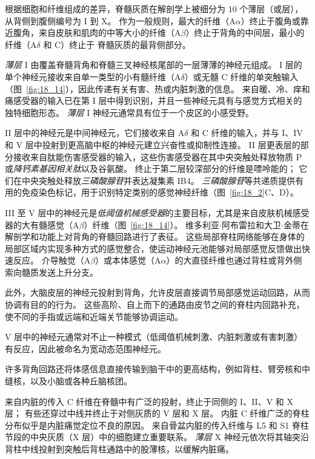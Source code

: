 根据细胞和纤维组成的差异，脊髓灰质在解剖学上被细分为 10 个薄层（或层），从背侧到腹侧编号为 I 到 X。
作为一般规则，最大的纤维（A$\alpha$）终止于腹角或靠近腹角，来自皮肤和肌肉的中等大小的纤维（A$\beta$）终止于背角的中间层，最小的纤维（A$\delta$ 和 C）终止于 脊髓灰质的最背侧部分。


\textit{薄层} I 由覆盖脊髓背角和脊髓三叉神经核尾部的一层薄薄的神经元组成。
I 层的单个神经元接收来自单一类型的小有髓纤维（A$\delta$）或无髓 C 纤维的单突触输入（图~\ref{fig:18_14}），因此传递有关有害、热或内脏刺激的信息。
来自暖、冷、痒和痛感受器的输入已在第 I 层中得到识别，并且一些神经元具有与感觉方式相关的独特细胞形态。
\textit{薄层} I 神经元通常具有位于一个皮区的小感受野。


II 层中的神经元是中间神经元，它们接收来自 A$\delta$ 和 C 纤维的输入，并与 I、IV 和 V 层中投射到更高脑中枢的神经元建立兴奋性或抑制性连接。
II 层更表层的部分接收来自肽能伤害感受器的输入，这些伤害感受器在其中央突触处释放物质 P 或\textit{降钙素基因相关肽}以及谷氨酸。
终止于第二层较深部分的纤维是嘌呤能的；
它们在中央突触处释放\textit{三磷酸腺苷}并表达凝集素 IB4。
\textit{三磷酸腺苷}等共递质提供有用的免疫染色标记，用于识别特定类别的感觉神经纤维（图~\ref{fig:18_2}C、D）。


III 至 V 层中的神经元是\textit{低阈值机械感受器}的主要目标，尤其是来自皮肤机械感受器的大有髓感觉（A$\beta$）纤维（图~\ref{fig:18_14}）。
维多利亚$\cdot$阿布雷拉和大卫$\cdot$金蒂在解剖学和功能上对背角的脊髓回路进行了表征。
这些局部脊柱网络能够在身体的局部区域内实现多种方式的感觉整合，使运动神经元池能够对局部感觉反馈做出快速反应。
介导触觉（A$\beta$）或本体感觉（A$\alpha$）的大直径纤维也通过背柱或背外侧索向髓质发送上升分支。


此外，大脑皮层的神经元投射到背角，允许皮层直接调节局部感觉运动回路，从而协调有目的的行为。
这些高阶、自上而下的通路由皮节之间的脊柱内回路补充，使不同的手指或远端和近端关节能够协调运动。


V 层中的神经元通常对不止一种模式（低阈值机械刺激、内脏刺激或有害刺激）有反应，因此被命名为宽动态范围神经元。


许多背角回路还将体感信息直接传输到脑干中的更高结构，例如背柱、臂旁核和中缝核，以及小脑或各种丘脑核团。


来自内脏的传入 C 纤维在脊髓中有广泛的投射，终止于同侧的 I、II、V 和 X 层；
有些还穿过中线并终止于对侧灰质的 V 层和 X 层。
内脏 C 纤维广泛的脊柱分布似乎是内脏痛觉定位不良的原因。 
来自骨盆内脏的传入纤维与 L5 和 S1 脊柱节段的中央灰质（X 层）中的细胞建立重要联系。 
\textit{薄层} X 神经元依次将其轴突沿背柱中线投射到突触后背柱通路中的股薄核，以缓解内脏痛。


